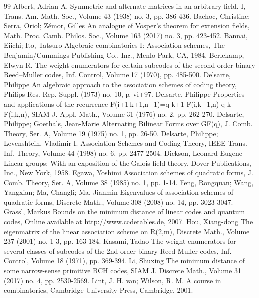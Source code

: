 \documentclass[10pt]{article}
\theoremstyle{definition}
\begin{document}
\begin{thebibliography}{99}
 Albert, Adrian A. Symmetric and alternate matrices in an arbitrary field. I, Trans. Am. Math. Soc., Volume 43 (1938) no. 3, pp. 386-436.
 Bachoc, Christine; Serra, Oriol; Zémor, Gilles An analogue of Vosper’s theorem for extension fields, Math. Proc. Camb. Philos. Soc., Volume 163 (2017) no. 3, pp. 423-452.
 Bannai, Eiichi; Ito, Tatsuro Algebraic combinatorics I: Association schemes, The Benjamin/Cummings Publishing Co., Inc., Menlo Park, CA, 1984.
 Berlekamp, Elwyn R. The weight enumerators for certain subcodes of the second order binary Reed–Muller codes, Inf. Control, Volume 17 (1970), pp. 485-500.
 Delsarte, Philippe An algebraic approach to the association schemes of coding theory, Philips Res. Rep. Suppl. (1973) no. 10, p. vi+97.
 Delsarte, Philippe Properties and applications of the recurrence F(i+1,k+1,n+1)=q k+1 F(i,k+1,n)-q k F(i,k,n), SIAM J. Appl. Math., Volume 31 (1976) no. 2, pp. 262-270.
 Delsarte, Philippe; Goethals, Jean-Marie Alternating Bilinear Forms over GF(q), J. Comb. Theory, Ser. A, Volume 19 (1975) no. 1, pp. 26-50.
 Delsarte, Philippe; Levenshtein, Vladimir I. Association Schemes and Coding Theory, IEEE Trans. Inf. Theory, Volume 44 (1998) no. 6, pp. 2477-2504.
 Dickson, Leonard Eugene Linear groups: With an exposition of the Galois field theory, Dover Publications, Inc., New York, 1958.
 Egawa, Yoshimi Association schemes of quadratic forms, J. Comb. Theory, Ser. A, Volume 38 (1985) no. 1, pp. 1-14.
 Feng, Rongquan; Wang, Yangxian; Ma, Changli; Ma, Jianmin Eigenvalues of association schemes of quadratic forms, Discrete Math., Volume 308 (2008) no. 14, pp. 3023-3047.
 Grassl, Markus Bounds on the minimum distance of linear codes and quantum codes, Online available at \url{http://www.codetables.de,} 2007.
 Hou, Xiang-dong The eigenmatrix of the linear association scheme on R(2,m), Discrete Math., Volume 237 (2001) no. 1-3, pp. 163-184.
 Kasami, Tadao The weight enumerators for several classes of subcodes of the 2nd order binary Reed-Muller codes, Inf. Control, Volume 18 (1971), pp. 369-394.
 Li, Shuxing The minimum distance of some narrow-sense primitive BCH codes, SIAM J. Discrete Math., Volume 31 (2017) no. 4, pp. 2530-2569.
 Lint, J. H. van; Wilson, R. M. A course in combinatorics, Cambridge University Press, Cambridge, 2001.

\end{thebibliography}
\end{document}
